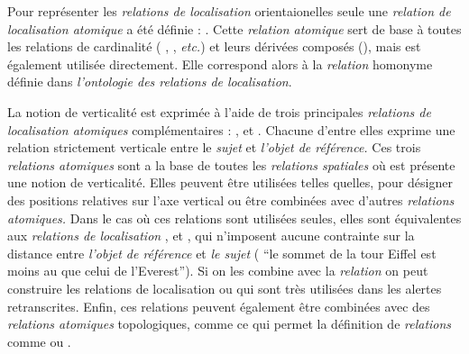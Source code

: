 Pour représenter les \emph{relations de localisation} orientaionelles
seule une \emph{relation de localisation atomique} a été définie :
. Cette \emph{relation atomique}
sert de base à toutes les relations de cardinalité (\ie
{}, , \emph{etc.}) et
leurs dérivées composés (\eg {}),
mais est également utilisée directement. Elle correspond alors à la
\emph{relation} homonyme définie dans \emph{l'ontologie des relations
  de localisation}.

La notion de verticalité est exprimée à l'aide de trois principales
\emph{relations de localisation atomiques} complémentaires :
,
 et
. Chacune
d'entre elles exprime une relation strictement verticale entre le
\emph{sujet} et \emph{l'objet de référence.} Ces trois \emph{relations
  atomiques} sont a la base de toutes les \emph{relations spatiales}
où est présente une notion de verticalité. Elles peuvent être
utilisées telles quelles, pour désigner des positions relatives sur
l'axe vertical ou être combinées avec d'autres \emph{relations
  atomiques.} Dans le cas où ces relations sont utilisées seules,
elles sont équivalentes aux \emph{relations de localisation}
,
 et
, qui n'imposent aucune contrainte sur
la distance entre \emph{l'objet de référence} et \emph{le sujet} (\eg
\enquote{le sommet de la tour Eiffel est moins au que celui de
  l’Everest}). Si on les combine avec la \emph{relation}
 on peut construire les
relations de localisation  ou
 qui sont très utilisées dans
les alertes retranscrites. Enfin, ces relations peuvent également être
combinées avec des \emph{relations atomiques} topologiques, comme
 ce qui permet la définition de
\emph{relations} comme  ou
.

